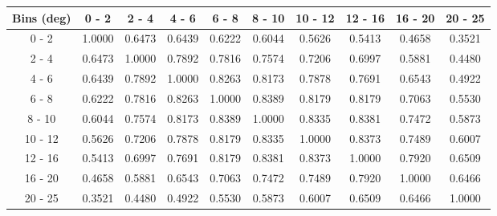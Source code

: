 \documentclass[aps, prd, reprint,showpacs,  preprintnumbers,amsmath,amssymb,superscriptaddress, nofootinbib]{revtex4-1}
\makeatletter
\renewenvironment{table}
  {\def\@captype{table}}
  {}
\makeatother
\begin{document}
\begin{table}
\centering
\begin{tabular}{cccccccccc}
\hline
Bins (deg) & 0 - 2 & 2 - 4 & 4 - 6 & 6 - 8 & 8 - 10 & 10 - 12 & 12 - 16 & 16 - 20 & 20 - 25 \\ 
\hline
0 - 2 & 1.0000 & 0.6473 & 0.6439 & 0.6222 & 0.6044 & 0.5626 & 0.5413 & 0.4658 & 0.3521 \\ 
2 - 4 & 0.6473 & 1.0000 & 0.7892 & 0.7816 & 0.7574 & 0.7206 & 0.6997 & 0.5881 & 0.4480 \\ 
4 - 6 & 0.6439 & 0.7892 & 1.0000 & 0.8263 & 0.8173 & 0.7878 & 0.7691 & 0.6543 & 0.4922 \\ 
6 - 8 & 0.6222 & 0.7816 & 0.8263 & 1.0000 & 0.8389 & 0.8179 & 0.8179 & 0.7063 & 0.5530 \\ 
8 - 10 & 0.6044 & 0.7574 & 0.8173 & 0.8389 & 1.0000 & 0.8335 & 0.8381 & 0.7472 & 0.5873 \\ 
10 - 12 & 0.5626 & 0.7206 & 0.7878 & 0.8179 & 0.8335 & 1.0000 & 0.8373 & 0.7489 & 0.6007 \\ 
12 - 16 & 0.5413 & 0.6997 & 0.7691 & 0.8179 & 0.8381 & 0.8373 & 1.0000 & 0.7920 & 0.6509 \\ 
16 - 20 & 0.4658 & 0.5881 & 0.6543 & 0.7063 & 0.7472 & 0.7489 & 0.7920 & 1.0000 & 0.6466 \\ 
20 - 25 & 0.3521 & 0.4480 & 0.4922 & 0.5530 & 0.5873 & 0.6007 & 0.6509 & 0.6466 & 1.0000 \\ 
\hline
\hline
\end{tabular}
\caption{Correlation matrix for bins of $d\sigma/d\theta_\mu$.}
\label{tb:pip_muth_cov}
\end{table}

\vspace{0.7cm}
\end{document}
